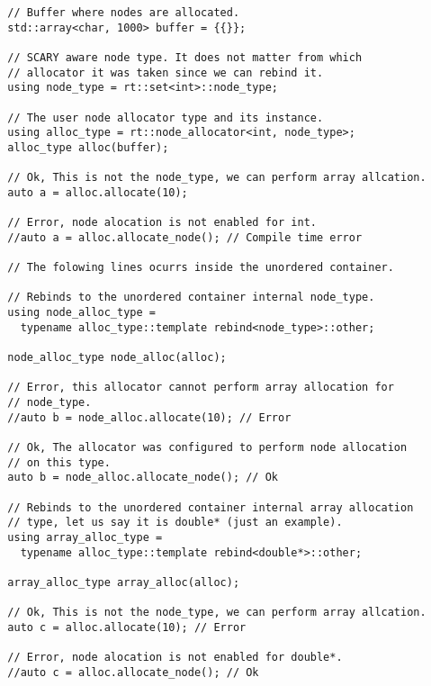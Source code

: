 \documentclass[11pt]{article}
\begin{document}
\medskip
\begin{lstlisting}
  // Buffer where nodes are allocated.
  std::array<char, 1000> buffer = {{}};

  // SCARY aware node type. It does not matter from which
  // allocator it was taken since we can rebind it.
  using node_type = rt::set<int>::node_type;

  // The user node allocator type and its instance.
  using alloc_type = rt::node_allocator<int, node_type>;
  alloc_type alloc(buffer);

  // Ok, This is not the node_type, we can perform array allcation.
  auto a = alloc.allocate(10);

  // Error, node alocation is not enabled for int.
  //auto a = alloc.allocate_node(); // Compile time error

  // The folowing lines ocurrs inside the unordered container.

  // Rebinds to the unordered container internal node_type. 
  using node_alloc_type =
    typename alloc_type::template rebind<node_type>::other;

  node_alloc_type node_alloc(alloc);

  // Error, this allocator cannot perform array allocation for
  // node_type.
  //auto b = node_alloc.allocate(10); // Error

  // Ok, The allocator was configured to perform node allocation
  // on this type.
  auto b = node_alloc.allocate_node(); // Ok

  // Rebinds to the unordered container internal array allocation
  // type, let us say it is double* (just an example). 
  using array_alloc_type =
    typename alloc_type::template rebind<double*>::other;

  array_alloc_type array_alloc(alloc);

  // Ok, This is not the node_type, we can perform array allcation.
  auto c = alloc.allocate(10); // Error

  // Error, node alocation is not enabled for double*.
  //auto c = alloc.allocate_node(); // Ok
\end{lstlisting}
\end{document}
